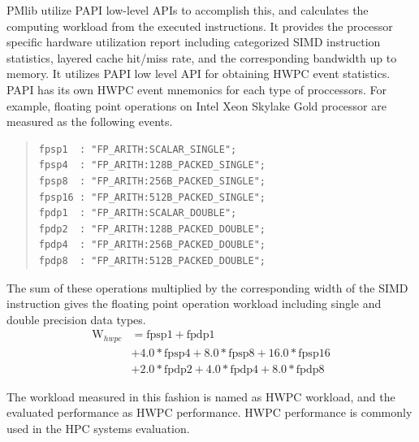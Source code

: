 \documentclass[conference]{IEEEtran}
\begin{document}
PMlib utilize PAPI low-level APIs to accomplish this,
and calculates the computing workload from the executed instructions.
It provides the processor specific hardware utilization report
including categorized SIMD instruction statistics,
layered cache hit/miss rate, and the corresponding bandwidth up to memory.
It utilizes PAPI low level API for obtaining HWPC event statistics.
PAPI has its own HWPC event mnemonics for each type of proccessors.
For example, floating point operations on
Intel Xeon Skylake Gold processor %
are measured as the following events.
\vspace{1mm}
\begin{quote}
\begin{small}
\begin{verbatim}
fpsp1  : "FP_ARITH:SCALAR_SINGLE";
fpsp4  : "FP_ARITH:128B_PACKED_SINGLE";
fpsp8  : "FP_ARITH:256B_PACKED_SINGLE";
fpsp16 : "FP_ARITH:512B_PACKED_SINGLE";
fpdp1  : "FP_ARITH:SCALAR_DOUBLE";
fpdp2  : "FP_ARITH:128B_PACKED_DOUBLE";
fpdp4  : "FP_ARITH:256B_PACKED_DOUBLE";
fpdp8  : "FP_ARITH:512B_PACKED_DOUBLE";
\end{verbatim}
\end{small}
\end{quote}
\vspace{1mm}
The sum of these operations multiplied by the corresponding width
of the SIMD instruction gives the floating point operation workload
including single and double precision data types.
\begin{align}
	\mathrm{W}_{hwpc} & = \mathrm{fpsp1} + \mathrm{fpdp1} \nonumber \\
			& + 4.0*\mathrm{fpsp4} + 8.0*\mathrm{fpsp8} + 16.0*\mathrm{fpsp16} \nonumber \\
			& + 2.0*\mathrm{fpdp2} + 4.0*\mathrm{fpdp4} + 8.0*\mathrm{fpdp8}
\end{align}

\noindent The workload measured in this fashion is named as HWPC workload,
and the evaluated performance as HWPC performance.
HWPC performance is commonly used in the HPC systems evaluation.
\end{document}
